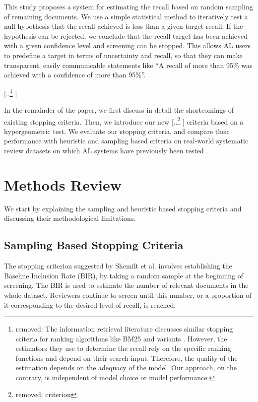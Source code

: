 \documentclass{bmcart}
\providecommand{\DIFadd}[1]{{\protect\color{blue} \sf #1}} %
\providecommand{\DIFdel}[1]{{\protect\color{red} [..\footnote{removed: #1} ]}} %
\providecommand{\DIFaddbegin}{} %
\providecommand{\DIFaddend}{} %
\providecommand{\DIFdelbegin}{} %
\providecommand{\DIFdelend}{} %
\newcommand{\DIFscaledelfig}{0.5}
\newlength{\DIFdelgraphicswidth} %
\newlength{\DIFdelgraphicsheight} %
\newcommand{\DIFaddincludegraphics}[2][]{{\color{blue}\fbox{\DIFOincludegraphics[#1]{#2}}}} %
\newcommand{\DIFdelincludegraphics}[2][]{%
\sbox{\DIFdelgraphicsbox}{\DIFOincludegraphics[#1]{#2}}%
\settoboxwidth{\DIFdelgraphicswidth}{\DIFdelgraphicsbox} %
\settoboxtotalheight{\DIFdelgraphicsheight}{\DIFdelgraphicsbox} %
\scalebox{\DIFscaledelfig}{%
\parbox[b]{\DIFdelgraphicswidth}{\usebox{\DIFdelgraphicsbox}\\[-\baselineskip] \rule{\DIFdelgraphicswidth}{0em}}\llap{\resizebox{\DIFdelgraphicswidth}{\DIFdelgraphicsheight}{%
\setlength{\unitlength}{\DIFdelgraphicswidth}%
\begin{picture}(1,1)%
\thicklines\linethickness{2pt} %
{\color[rgb]{1,0,0}\put(0,0){\framebox(1,1){}}}%
{\color[rgb]{1,0,0}\put(0,0){\line( 1,1){1}}}%
{\color[rgb]{1,0,0}\put(0,1){\line(1,-1){1}}}%
\end{picture}%
}\hspace*{3pt}}} %
} %
\DeclareRobustCommand{\DIFaddbegin}{\DIFOaddbegin \let\includegraphics\DIFaddincludegraphics} %
\DeclareRobustCommand{\DIFaddend}{\DIFOaddend \let\includegraphics\DIFOincludegraphics} %
\DeclareRobustCommand{\DIFdelbegin}{\DIFOdelbegin \let\includegraphics\DIFdelincludegraphics} %
\DeclareRobustCommand{\DIFdelend}{\DIFOaddend \let\includegraphics\DIFOincludegraphics} %
\begin{document}
	This study proposes a system for estimating the recall based on random sampling of remaining documents. 
	We use a simple statistical method to iteratively test a null hypothesis that the recall achieved is less than a given target recall. If the hypothesis can be rejected, we conclude that the recall target has been achieved with a given confidence level and screening can be stopped.
	This allows AL users to predefine a target in terms of uncertainty and recall, so that they can make transparent, easily communicable statements like ``A recall of more than 95\% was achieved with a confidence of \DIFaddbegin \DIFadd{more than }\DIFaddend 95\%''.

	
	
	\DIFdelbegin \DIFdel{The information retrieval literature discusses similar stopping criteria for ranking algorithms like BM25 and variants \cite{DiNunzio2018, Yu2019}. However, the estimators they use to determine the recall rely on the specific ranking functions and depend on their search input. Therefore, the quality of the estimation depends on the adequacy of the model. Our approach, on the contrary, is independent of model choice or model performance. 
	}%

\DIFdelend In the remainder of the paper, we first discuss in detail the shortcomings of existing stopping criteria. Then, we introduce our new \DIFdelbegin \DIFdel{criterion }\DIFdelend \DIFaddbegin \DIFadd{criteria }\DIFaddend based on a hypergeometric test. We evaluate our stopping criteria, and compare their performance with heuristic and sampling based criteria on real-world systematic review datasets on which AL systems have previously been tested \cite{Cohen2006, Yu2019, Terasawa2009, Castaldi2009}.

	\section*{Methods Review}

	
	We start by explaining the sampling and heuristic based stopping criteria and discussing their methodological limitations. 

	\subsection*{Sampling Based Stopping Criteria}

	The stopping criterion suggested by Shemilt et al. \cite{Shemilt2014} involves establishing the Baseline Inclusion Rate (BIR), by taking a random sample at the beginning of screening. 
	The BIR is used to estimate the number of relevant documents in the whole dataset. 
	Reviewers continue to screen until this number, or a proportion of it corresponding to the desired level of recall, is reached.
\end{document}
